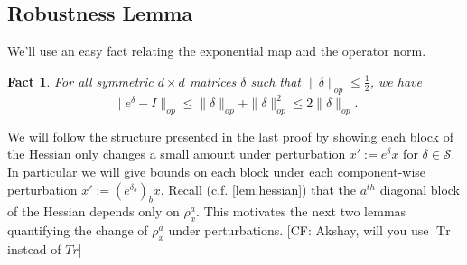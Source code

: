 \documentclass[aos]{imsart}
\newtheorem{corollary}[theorem]{Corollary}
\newtheorem{fact}[theorem]{Fact}
\theoremstyle{definition}
\numberwithin{equation}{section}
\DeclareMathOperator{\tr}{Tr}
\newcommand{\R}{{\mathbb{R}}}
\newcommand{\Sym}{\mathcal{S}}
\newcommand{\samp}{x}
\newcommand{\CF}[1]{{\color{purple}[CF: #1]}}
\begin{document}
\begin{appendix}


\section{Robustness Lemma}
We'll use an easy fact relating the exponential map and the operator norm.

\begin{fact} For all symmetric $d\times d$ matrices $\delta $ such that $ \|\delta\|_{op} \leq \frac{1}{2}$, we have
$$ \|e^{\delta} - I\|_{op} \leq \|\delta\|_{op} + \|\delta\|_{op}^{2} \leq 2 \|\delta\|_{op}.$$
\end{fact}

We will follow the structure presented in the last proof %
by showing each block of the Hessian only changes a small amount under perturbation $x' := e^{\delta} x$ for $\delta \in \Sym$. In particular we will give bounds on each block under each component-wise perturbation $x' := (e^{\delta_{b}})_{b} x$. Recall (c.f. \cref{lem:hessian}) that the $a^{th}$ diagonal block of the Hessian depends only on $\rho^a_{\samp}$. This motivates the next two lemmas quantifying the change of $\rho^{a}
_{\samp}$ under perturbations. \CF{Akshay, will you use $\tr$ instead of $Tr$}



\end{appendix}
\end{document}

